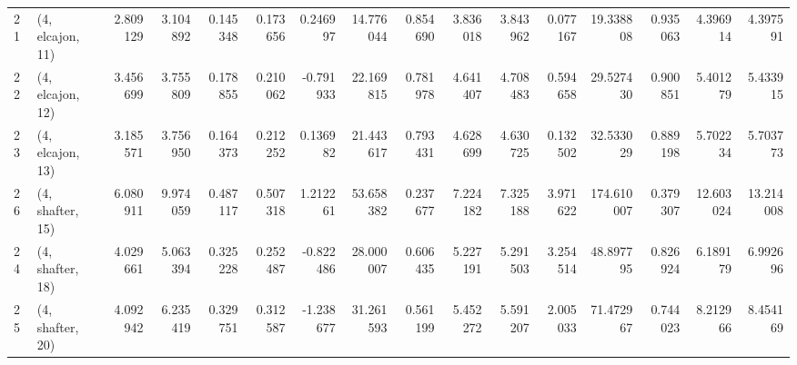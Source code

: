 \begin{tabular}{llrrrrrrrrrrrrrr}
21 &  (4, elcajon, 11) &  2.809129 &   3.104892 &   0.145348 &  0.173656 &  0.246997 &  14.776044 &  0.854690 &   3.836018 &  3.843962 &  0.077167 &   19.338808 &  0.935063 &   4.396914 &   4.397591 \\
22 &  (4, elcajon, 12) &  3.456699 &   3.755809 &   0.178855 &  0.210062 & -0.791933 &  22.169815 &  0.781978 &   4.641407 &  4.708483 &  0.594658 &   29.527430 &  0.900851 &   5.401279 &   5.433915 \\
23 &  (4, elcajon, 13) &  3.185571 &   3.756950 &   0.164373 &  0.212252 &  0.136982 &  21.443617 &  0.793431 &   4.628699 &  4.630725 &  0.132502 &   32.533029 &  0.889198 &   5.702234 &   5.703773 \\
26 &  (4, shafter, 15) &  6.080911 &   9.974059 &   0.487117 &  0.507318 &  1.212261 &  53.658382 &  0.237677 &   7.224182 &  7.325188 &  3.971622 &  174.610007 &  0.379307 &  12.603024 &  13.214008 \\
24 &  (4, shafter, 18) &  4.029661 &   5.063394 &   0.325228 &  0.252487 & -0.822486 &  28.000007 &  0.606435 &   5.227191 &  5.291503 &  3.254514 &   48.897795 &  0.826924 &   6.189179 &   6.992696 \\
25 &  (4, shafter, 20) &  4.092942 &   6.235419 &   0.329751 &  0.312587 & -1.238677 &  31.261593 &  0.561199 &   5.452272 &  5.591207 &  2.005033 &   71.472967 &  0.744023 &   8.212966 &   8.454169 \\
\bottomrule
\end{tabular}
